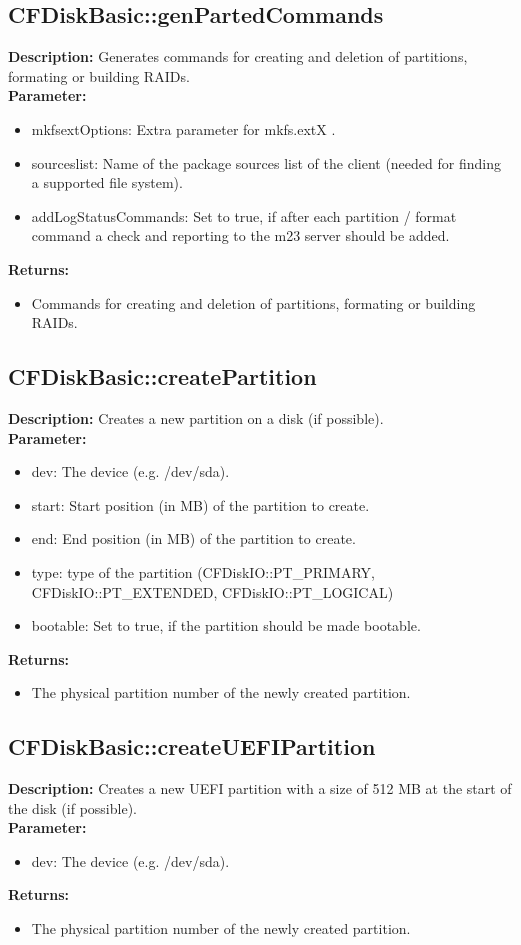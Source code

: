 \subsection{CFDiskBasic::genPartedCommands}
\textbf{Description:} Generates commands for creating and deletion of partitions, formating or building RAIDs.\\
\textbf{Parameter:}
\begin{itemize}
\item mkfsextOptions: Extra parameter for mkfs.extX .
\item sourceslist: Name of the package sources list of the client (needed for finding a supported file system).
\item addLogStatusCommands: Set to true, if after each partition / format command a check and reporting to the m23 server should be added.
\end{itemize}
\textbf{Returns:}
\begin{itemize}
\item Commands for creating and deletion of partitions, formating or building RAIDs.
\end{itemize}

\subsection{CFDiskBasic::createPartition}
\textbf{Description:} Creates a new partition on a disk (if possible).\\
\textbf{Parameter:}
\begin{itemize}
\item dev: The device (e.g. /dev/sda).
\item start: Start position (in MB) of the partition to create.
\item end: End position (in MB) of the partition to create.
\item type: type of the partition (CFDiskIO::PT\_PRIMARY, CFDiskIO::PT\_EXTENDED, CFDiskIO::PT\_LOGICAL)
\item bootable: Set to true, if the partition should be made bootable.
\end{itemize}
\textbf{Returns:}
\begin{itemize}
\item The physical partition number of the newly created partition.
\end{itemize}

\subsection{CFDiskBasic::createUEFIPartition}
\textbf{Description:} Creates a new UEFI partition with a size of 512 MB at the start of the disk (if possible).\\
\textbf{Parameter:}
\begin{itemize}
\item dev: The device (e.g. /dev/sda).
\end{itemize}
\textbf{Returns:}
\begin{itemize}
\item The physical partition number of the newly created partition.
\end{itemize}

